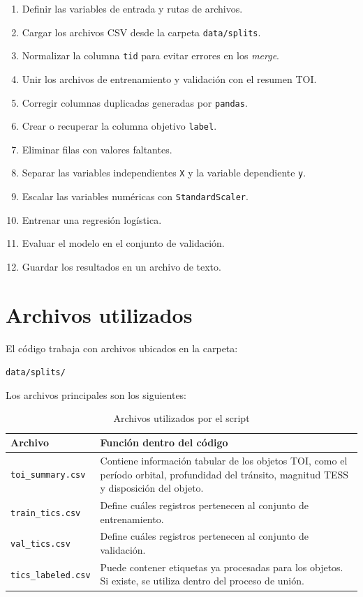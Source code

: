 \documentclass[12pt,letterpaper]{article}
\begin{document}
\begin{enumerate}
    \item Definir las variables de entrada y rutas de archivos.
    \item Cargar los archivos CSV desde la carpeta \texttt{data/splits}.
    \item Normalizar la columna \texttt{tid} para evitar errores en los \textit{merge}.
    \item Unir los archivos de entrenamiento y validación con el resumen TOI.
    \item Corregir columnas duplicadas generadas por \texttt{pandas}.
    \item Crear o recuperar la columna objetivo \texttt{label}.
    \item Eliminar filas con valores faltantes.
    \item Separar las variables independientes \texttt{X} y la variable dependiente \texttt{y}.
    \item Escalar las variables numéricas con \texttt{StandardScaler}.
    \item Entrenar una regresión logística.
    \item Evaluar el modelo en el conjunto de validación.
    \item Guardar los resultados en un archivo de texto.
\end{enumerate}

\section{Archivos utilizados}

El código trabaja con archivos ubicados en la carpeta:

\begin{center}
\texttt{data/splits/}
\end{center}

Los archivos principales son los siguientes:

\begin{table}[H]
\centering
\caption{Archivos utilizados por el script}
\begin{tabular}{p{4cm} p{10cm}}
\toprule
\textbf{Archivo} & \textbf{Función dentro del código} \\
\midrule
\texttt{toi\_summary.csv} & Contiene información tabular de los objetos TOI, como el período orbital, profundidad del tránsito, magnitud TESS y disposición del objeto. \\
\texttt{train\_tics.csv} & Define cuáles registros pertenecen al conjunto de entrenamiento. \\
\texttt{val\_tics.csv} & Define cuáles registros pertenecen al conjunto de validación. \\
\texttt{tics\_labeled.csv} & Puede contener etiquetas ya procesadas para los objetos. Si existe, se utiliza dentro del proceso de unión. \\
\bottomrule
\end{tabular}
\end{table}
\end{document}
